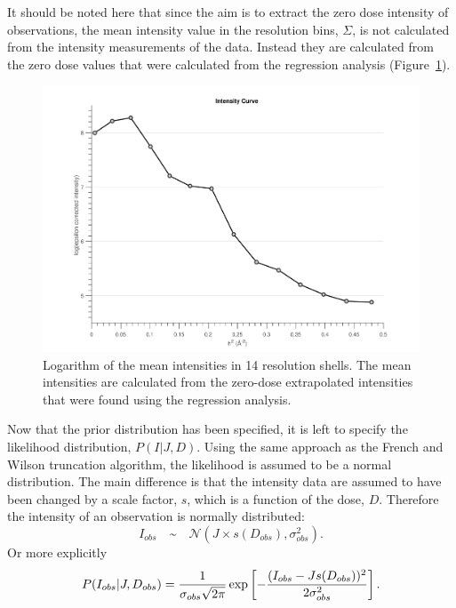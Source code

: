 It should be noted here that since the aim is to extract the zero dose intensity of observations, the mean intensity value in the resolution bins, $\Sigma$, is not calculated from the intensity measurements of the data.
Instead they are calculated from the zero dose values that were calculated from the regression analysis (Figure~\ref{fig:Zero-dose mean intensity in resolution shells - Extrapolation method}).
\begin{figure}
  \centering
    \includegraphics[width=1\textwidth]{figures/zde/extrapolationscaling.pdf}
    \caption[Logarithm of the zero-dose mean intensities in 14 resolution shells.]{Logarithm of the mean intensities in 14 resolution shells.
    The mean intensities are calculated from the zero-dose extrapolated intensities that were found using the regression analysis.}
    \label{fig:Zero-dose mean intensity in resolution shells - Extrapolation method}
\end{figure}

Now that the prior distribution has been specified, it is left to specify the likelihood distribution, $P(I | J, D)$.
Using the same approach as the French and Wilson truncation algorithm, the likelihood is assumed to be a normal distribution.
The main difference is that the intensity data are assumed to have been changed by a scale factor, $s$, which is a function of the dose, $D$.
Therefore the intensity of an observation is normally distributed:
\begin{equation}
    I_{obs} \quad \text{\textasciitilde} \quad \mathcal{N}(J \times s(D_{obs}),\sigma_{obs}^2).
    \label{eq:Normally distributed intensity - Extrapolation method}
\end{equation}
Or more explicitly
\begin{equation}
    P(I_{obs} | J, D_{obs}) = \frac{1}{\sigma_{obs} \sqrt{2\pi}} \exp \left[-\frac{(I_{obs} - J s(D_{obs}))^2}{2 \sigma^2_{obs}} \right].
    \label{eq:Normally distributed intensity full equation - Extrapolation method}
\end{equation}

